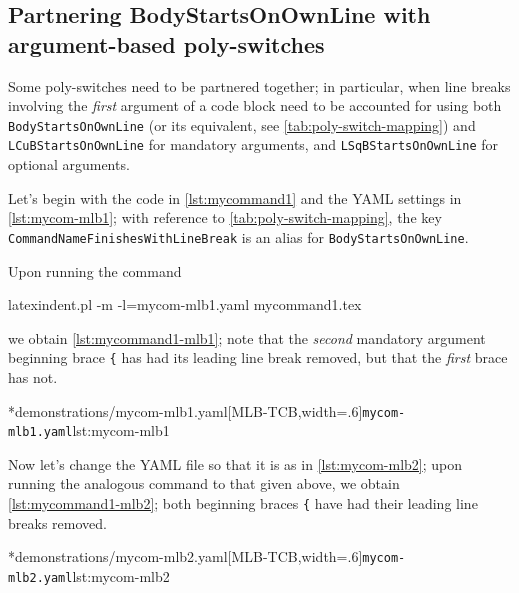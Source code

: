 \subsection{Partnering BodyStartsOnOwnLine with argument-based poly-switches}
	Some poly-switches need to be partnered together; in particular, when line breaks
	involving the \emph{first} argument of a code block need to be accounted for using both
	\texttt{BodyStartsOnOwnLine} (or its equivalent, see \vref{tab:poly-switch-mapping}) and
	\texttt{LCuBStartsOnOwnLine} for mandatory arguments, and \texttt{LSqBStartsOnOwnLine}
	for optional arguments.

	Let's begin with the code in \cref{lst:mycommand1} and the YAML settings in
	\cref{lst:mycom-mlb1}; with reference to \vref{tab:poly-switch-mapping}, the key
	\texttt{CommandNameFinishesWithLineBreak} is an alias for \texttt{BodyStartsOnOwnLine}.


	Upon running the command
	\begin{commandshell}
latexindent.pl -m -l=mycom-mlb1.yaml mycommand1.tex
\end{commandshell}
	we obtain \cref{lst:mycommand1-mlb1}; note that the \emph{second} mandatory argument
	beginning brace \lstinline!{! has had its leading line break removed, but that the
	\emph{first} brace has not.

	\begin{cmhtcbraster}[
			raster force size=false,
			raster column 1/.style={add to width=-1cm},
		]
		\cmhlistingsfromfile[style=yaml-LST]*{demonstrations/mycom-mlb1.yaml}[MLB-TCB,width=.6\textwidth]{\texttt{mycom-mlb1.yaml}}{lst:mycom-mlb1}
	\end{cmhtcbraster}

	Now let's change the YAML file so that it is as in \cref{lst:mycom-mlb2}; upon running
	the analogous command to that given above, we obtain \cref{lst:mycommand1-mlb2}; both
	beginning braces \lstinline!{! have had their leading line breaks removed.

	\begin{cmhtcbraster}[
			raster force size=false,
			raster column 1/.style={add to width=-1cm},
		]
		\cmhlistingsfromfile[style=yaml-LST]*{demonstrations/mycom-mlb2.yaml}[MLB-TCB,width=.6\textwidth]{\texttt{mycom-mlb2.yaml}}{lst:mycom-mlb2}
	\end{cmhtcbraster}

